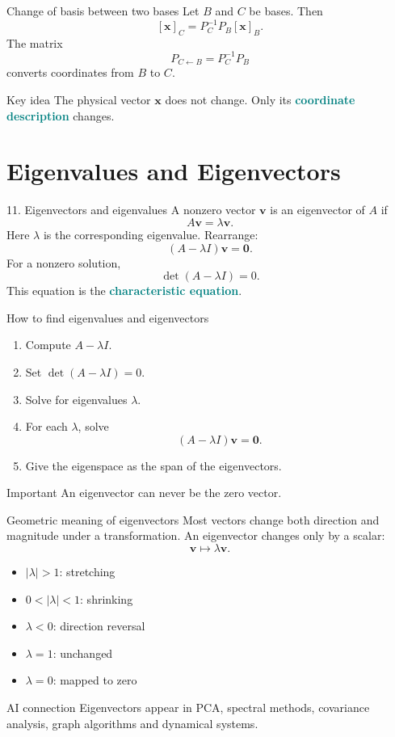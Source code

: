 \documentclass[aspectratio=169,11pt]{beamer}
\newcommand{\vect}[1]{\bm{#1}}
\newcommand{\important}[1]{\textcolor{teal}{\textbf{#1}}}
\begin{document}
\begin{frame}{Change of basis between two bases}
Let $B$ and $C$ be bases. Then
\[
[\vect x]_C=P_C^{-1}P_B[\vect x]_B.
\]
The matrix
\[
P_{C\leftarrow B}=P_C^{-1}P_B
\]
converts coordinates from $B$ to $C$.
\begin{block}{Key idea}
The physical vector $\vect x$ does not change. Only its \important{coordinate description} changes.
\end{block}

\end{frame}

\section{Eigenvalues and Eigenvectors}
\begin{frame}{11. Eigenvectors and eigenvalues}
A nonzero vector $\vect v$ is an eigenvector of $A$ if
\[
A\vect v=\lambda\vect v.
\]
Here $\lambda$ is the corresponding eigenvalue.
Rearrange:
\[
(A-\lambda I)\vect v=\vect0.
\]
For a nonzero solution,
\[
\boxed{\det(A-\lambda I)=0.}
\]
This equation is the \important{characteristic equation}.
\end{frame}

\begin{frame}{How to find eigenvalues and eigenvectors}
\begin{enumerate}
\item Compute $A-\lambda I$.
\item Set $\det(A-\lambda I)=0$.
\item Solve for eigenvalues $\lambda$.
\item For each $\lambda$, solve
\[
(A-\lambda I)\vect v=\vect0.
\]
\item Give the eigenspace as the span of the eigenvectors.
\end{enumerate}
\begin{alertblock}{Important}
An eigenvector can never be the zero vector.
\end{alertblock}
\end{frame}

\begin{frame}{Geometric meaning of eigenvectors}
Most vectors change both direction and magnitude under a transformation.
An eigenvector changes only by a scalar:
\[
\vect v\longmapsto \lambda\vect v.
\]
\begin{itemize}
\item $|\lambda|>1$: stretching
\item $0<|\lambda|<1$: shrinking
\item $\lambda<0$: direction reversal
\item $\lambda=1$: unchanged
\item $\lambda=0$: mapped to zero
\end{itemize}
\begin{block}{AI connection}
Eigenvectors appear in PCA, spectral methods, covariance analysis, graph algorithms and dynamical systems.
\end{block}
\end{frame}
\end{document}
